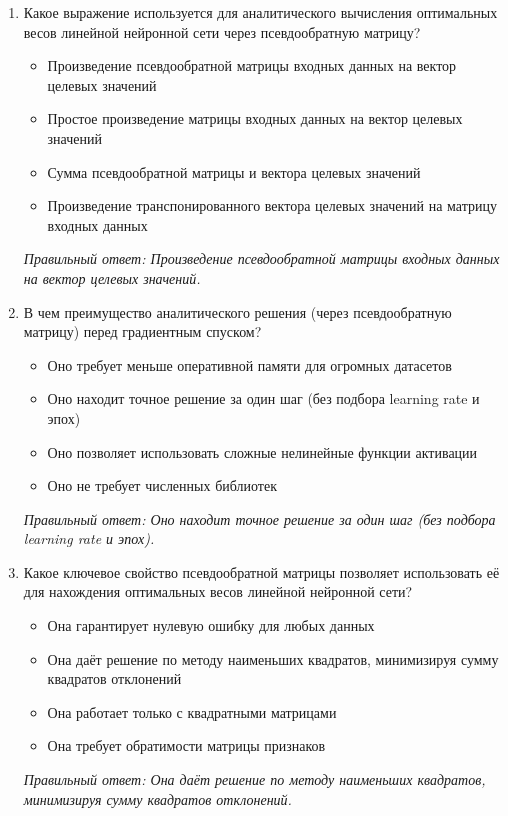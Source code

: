 \begin{enumerate}[label=\textbf{\arabic*.}, leftmargin=0pt, itemsep=1.2em]
\item Какое выражение используется для аналитического вычисления оптимальных весов линейной нейронной сети через псевдообратную матрицу?
\begin{itemize}[label=$\square$, leftmargin=1.5cm, itemsep=0.2em, topsep=0.3em]
\item Произведение псевдообратной матрицы входных данных на вектор целевых значений
\item Простое произведение матрицы входных данных на вектор целевых значений
\item Сумма псевдообратной матрицы и вектора целевых значений
\item Произведение транспонированного вектора целевых значений на матрицу входных данных
\end{itemize}
{\small\textit{Правильный ответ: Произведение псевдообратной матрицы входных данных на вектор целевых значений.}}

\item В чем преимущество аналитического решения (через псевдообратную матрицу) перед градиентным спуском?
\begin{itemize}[label=$\square$, leftmargin=1.5cm, itemsep=0.2em, topsep=0.3em]
\item Оно требует меньше оперативной памяти для огромных датасетов
\item Оно находит точное решение за один шаг (без подбора learning rate и эпох)
\item Оно позволяет использовать сложные нелинейные функции активации
\item Оно не требует численных библиотек
\end{itemize}
{\small\textit{Правильный ответ: Оно находит точное решение за один шаг (без подбора learning rate и эпох).}}

\item Какое ключевое свойство псевдообратной матрицы позволяет использовать её для нахождения оптимальных весов линейной нейронной сети?
\begin{itemize}[label=$\square$, leftmargin=1.5cm, itemsep=0.2em, topsep=0.3em]
\item Она гарантирует нулевую ошибку для любых данных
\item Она даёт решение по методу наименьших квадратов, минимизируя сумму квадратов отклонений
\item Она работает только с квадратными матрицами
\item Она требует обратимости матрицы признаков
\end{itemize}
{\small\textit{Правильный ответ: Она даёт решение по методу наименьших квадратов, минимизируя сумму квадратов отклонений.}}


\end{enumerate}
